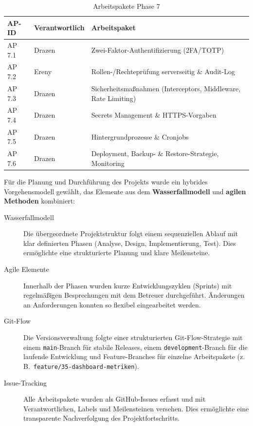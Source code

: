 \begin{table}[H]
    \centering
    \caption{Arbeitspakete Phase 7}
    \begin{tabularx}{\textwidth}{llX}
        \toprule
        \textbf{AP-ID} & \textbf{Verantwortlich} & \textbf{Arbeitspaket} \\
        \midrule
        AP 7.1 & Drazen & Zwei-Faktor-Authentifizierung (2FA/TOTP) \\
        AP 7.2 & Ereny  & Rollen-/Rechteprüfung serverseitig \&
                          Audit-Log \\
        AP 7.3 & Drazen & Sicherheitsmaßnahmen (Interceptors,
                          Middleware, Rate Limiting) \\
        AP 7.4 & Drazen & Secrets Management \& HTTPS-Vorgaben \\
        AP 7.5 & Drazen & Hintergrundprozesse \& Cronjobs \\
        AP 7.6 & Drazen & Deployment, Backup- \&
                          Restore-Strategie, Monitoring \\
        \bottomrule
    \end{tabularx}
    \label{tab:ap7}
\end{table}


Für die Planung und Durchführung des Projekts wurde ein hybrides
Vorgehensmodell gewählt, das Elemente aus dem \textbf{Wasserfallmodell}
und \textbf{agilen Methoden} kombiniert:

\begin{description}
    \item[Wasserfallmodell] Die übergeordnete Projektstruktur folgt
          einem sequenziellen Ablauf mit klar definierten Phasen
          (Analyse, Design, Implementierung, Test). Dies ermöglichte
          eine strukturierte Planung und klare Meilensteine.
    \item[Agile Elemente] Innerhalb der Phasen wurden kurze
          Entwicklungszyklen (Sprints) mit regelmäßigen Besprechungen
          mit dem Betreuer durchgeführt. Änderungen an Anforderungen
          konnten so flexibel eingearbeitet werden.
    \item[Git-Flow] Die Versionsverwaltung folgte einer strukturierten
          Git-Flow-Strategie mit einem \texttt{main}-Branch für stabile
          Releases, einem \texttt{development}-Branch für die laufende
          Entwicklung und Feature-Branches für einzelne Arbeitspakete
          (z.\,B.\ \texttt{feature/35-dashboard-metriken}).
    \item[Issue-Tracking] Alle Arbeitspakete wurden als GitHub-Issues
          erfasst und mit Verantwortlichen, Labels und Meilensteinen
          versehen. Dies ermöglichte eine transparente Nachverfolgung
          des Projektfortschritts.
\end{description}


